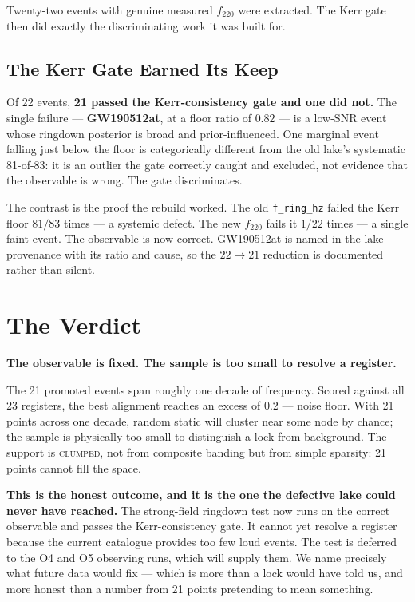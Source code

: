 \documentclass[11pt, letterpaper, openany]{book}
\begin{document}
Twenty-two events with genuine measured $f_{220}$ were extracted. The Kerr gate then did
exactly the discriminating work it was built for.

\subsection{The Kerr Gate Earned Its Keep}

\begin{signalbox}
Of 22 events, \textbf{21 passed the Kerr-consistency gate and one did not.} The single failure
--- \textbf{GW190512at}, at a floor ratio of $0.82$ --- is a low-SNR event whose ringdown
posterior is broad and prior-influenced. One marginal event falling just below the floor is
categorically different from the old lake's systematic 81-of-83: it is an outlier the gate
correctly caught and excluded, not evidence that the observable is wrong. The gate discriminates.
\end{signalbox}

The contrast is the proof the rebuild worked. The old \texttt{f\_ring\_hz} failed the Kerr floor
$81/83$ times --- a systemic defect. The new $f_{220}$ fails it $1/22$ times --- a single faint
event. The observable is now correct. GW190512at is named in the lake provenance with its ratio
and cause, so the $22 \to 21$ reduction is documented rather than silent.

\section{The Verdict}

\begin{nullbox}
\textbf{The observable is fixed. The sample is too small to resolve a register.}

\medskip
The 21 promoted events span roughly one decade of frequency. Scored against all 23 registers,
the best alignment reaches an excess of $0.2$ --- noise floor. With 21 points across one decade,
random static will cluster near some node by chance; the sample is physically too small to
distinguish a lock from background. The support is \textsc{clumped}, not from composite banding
but from simple sparsity: 21 points cannot fill the space.
\end{nullbox}

\begin{warningbox}
\textbf{This is the honest outcome, and it is the one the defective lake could never have
reached.} The strong-field ringdown test now runs on the correct observable and passes the
Kerr-consistency gate. It cannot yet resolve a register because the current catalogue provides
too few loud events. The test is deferred to the O4 and O5 observing runs, which will supply
them. We name precisely what future data would fix --- which is more than a lock would have told
us, and more honest than a number from 21 points pretending to mean something.
\end{warningbox}
\end{document}
